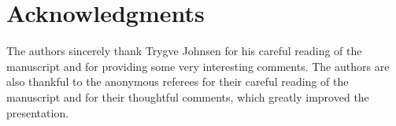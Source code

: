 \documentclass[10pt,a4paper,oneside]{amsproc}
\begin{document}
 


\section{Acknowledgments}
The authors sincerely thank Trygve Johnsen for his careful reading of the manuscript and for providing some very interesting comments. The authors are also thankful to the anonymous referees for their careful reading of the manuscript and for their thoughtful comments, which greatly improved the presentation. 
\end{document}
